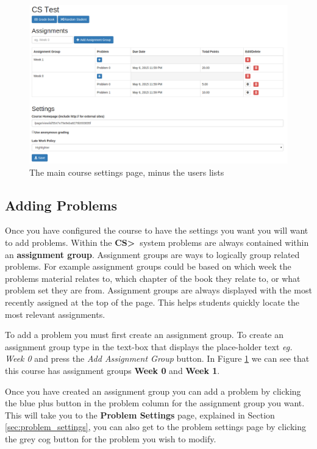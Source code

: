 \documentclass[11pt]{report}
\newcommand{\csgt}[0]{\textbf{CS\textgreater\ }}
\begin{document}
\begin{figure}
\centering
\includegraphics[width=\textwidth,height=\textheight,keepaspectratio]{diagrams/course_settings}
\caption{The main course settings page, minus the users lists}
\label{fig:course_settings}
\end{figure}

\subsection{Adding Problems}
Once you have configured the course to have the settings you want you will want to add problems.
Within the \csgt system problems are always contained within an \textbf{assignment group}. Assignment 
groups are ways to logically group related problems. For example assignment groups could be based on which week
the problems material relates to, which chapter of the book they relate to, or what problem set they are from.
Assignment groups are always displayed with the most recently assigned at the top of the page. This helps
students quickly locate the most relevant assignments.
	
To add a problem you must first create an assignment group. To create an assignment group type in the text-box
that displays the place-holder text \emph{eg. Week 0} and press the \emph{Add Assignment Group} button. In
Figure \ref{fig:course_settings} we can see that this course has assignment groups \textbf{Week 0} and 
\textbf{Week 1}. 

Once you have created an assignment group you can add a problem by clicking the blue plus button in the 
problem column for the assignment group you want. This will take you to the \textbf{Problem Settings} page, 
explained in Section \ref{sec:problem_settings}, you can also get to the problem settings page by clicking
the grey cog button for the problem you wish to modify.
\end{document}
